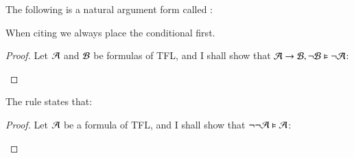 \begin{definition}
    The following is a natural argument form called : \begin{fitchproof}
         
    \end{fitchproof}
    When citing we always place the conditional first.
\end{definition}
\begin{proof}
    Let $\mathcal{A}$ and $\mathcal{B}$ be formulas of TFL, and I shall show that $\mathcal{A}\rightarrow\mathcal{B},\neg\mathcal{B}\vDash \neg\mathcal{A}$:
    \begin{fitchproof}
        \open
             
             
        \close
         
    \end{fitchproof}
\end{proof}


\begin{definition}
    The  rule states that: \begin{fitchproof}
         
    \end{fitchproof}
\end{definition}
\begin{proof}
    Let $\mathcal{A}$ be a formula of TFL, and I shall show that $\neg\neg\mathcal{A}\vDash \mathcal{A}$:
    \begin{fitchproof}
        \open
             
        \close
         
    \end{fitchproof}
\end{proof}


